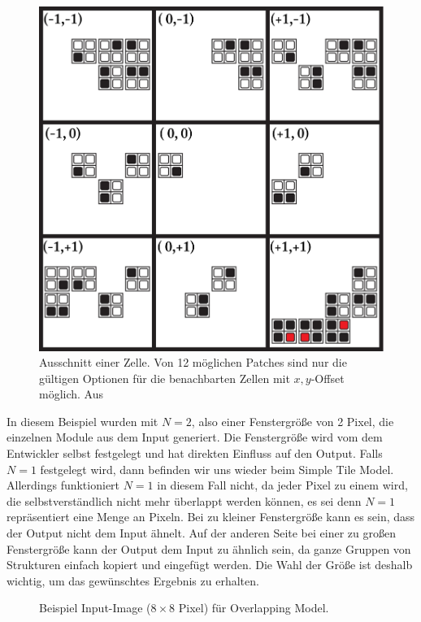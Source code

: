 \documentclass[12pt, a4paper,twoside,openright]{report} %
\begin{document}
\begin{figure}[H]
    \centering
    \includegraphics[width=0.5\linewidth]{images/red-maze-offset-example.png}%
    \caption{Ausschnitt einer Zelle. Von 12 möglichen Patches sind nur die gültigen Optionen für die benachbarten Zellen mit $x,y$-Offset möglich. Aus \cite{Karth2017WaveFunctionCollapseIC}}%
\end{figure}

In diesem Beispiel wurden mit $N = 2$, also einer Fenstergröße von 2 Pixel, die einzelnen Module aus dem Input generiert.
Die Fenstergröße wird vom dem Entwickler selbst festgelegt und hat direkten Einfluss auf den Output.
Falls $N = 1$ festgelegt wird, dann befinden wir uns wieder beim Simple Tile Model.
Allerdings funktioniert $N = 1$ in diesem Fall nicht, da jeder Pixel zu einem  wird, die selbstverständlich nicht mehr überlappt werden können,
es sei denn $N = 1$ repräsentiert eine Menge an Pixeln.
Bei zu kleiner Fenstergröße kann es sein, dass der Output nicht dem Input ähnelt.
Auf der anderen Seite bei einer zu großen Fenstergröße kann der Output dem Input zu ähnlich sein, da ganze Gruppen von Strukturen einfach kopiert und eingefügt werden.
Die Wahl der Größe ist deshalb wichtig, um das gewünschtes Ergebnis zu erhalten.

\begin{figure}[H]
    \centering
    \caption{Beispiel Input-Image ($8\times8$ Pixel) für Overlapping Model.}%
\end{figure}
\end{document}
